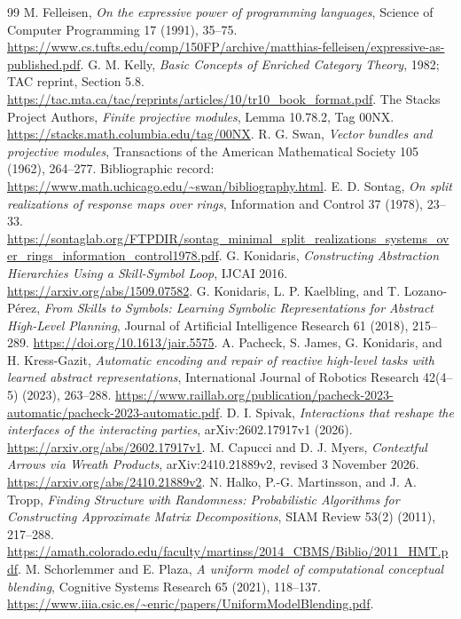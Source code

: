 \documentclass[11pt]{article}
\theoremstyle{definition}
\theoremstyle{remark}
\begin{document}
\begin{thebibliography}{99}
M. Felleisen, \emph{On the expressive power of programming languages}, Science of Computer Programming 17 (1991), 35--75.
\url{https://www.cs.tufts.edu/comp/150FP/archive/matthias-felleisen/expressive-as-published.pdf}.
G. M. Kelly, \emph{Basic Concepts of Enriched Category Theory}, 1982; TAC reprint, Section 5.8.
\url{https://tac.mta.ca/tac/reprints/articles/10/tr10_book_format.pdf}.
The Stacks Project Authors, \emph{Finite projective modules}, Lemma 10.78.2, Tag 00NX.
\url{https://stacks.math.columbia.edu/tag/00NX}.
R. G. Swan, \emph{Vector bundles and projective modules}, Transactions of the American Mathematical Society 105 (1962), 264--277.
Bibliographic record: \url{https://www.math.uchicago.edu/~swan/bibliography.html}.
E. D. Sontag, \emph{On split realizations of response maps over rings}, Information and Control 37 (1978), 23--33.
\url{https://sontaglab.org/FTPDIR/sontag_minimal_split_realizations_systems_over_rings_information_control1978.pdf}.
G. Konidaris, \emph{Constructing Abstraction Hierarchies Using a Skill-Symbol Loop}, IJCAI 2016.
\url{https://arxiv.org/abs/1509.07582}.
G. Konidaris, L. P. Kaelbling, and T. Lozano-P\'erez, \emph{From Skills to Symbols: Learning Symbolic Representations for Abstract High-Level Planning}, Journal of Artificial Intelligence Research 61 (2018), 215--289.
\url{https://doi.org/10.1613/jair.5575}.
A. Pacheck, S. James, G. Konidaris, and H. Kress-Gazit, \emph{Automatic encoding and repair of reactive high-level tasks with learned abstract representations}, International Journal of Robotics Research 42(4--5) (2023), 263--288.
\url{https://www.raillab.org/publication/pacheck-2023-automatic/pacheck-2023-automatic.pdf}.
D. I. Spivak, \emph{Interactions that reshape the interfaces of the interacting parties}, arXiv:2602.17917v1 (2026).
\url{https://arxiv.org/abs/2602.17917v1}.
M. Capucci and D. J. Myers, \emph{Contextful Arrows via Wreath Products}, arXiv:2410.21889v2, revised 3 November 2026.
\url{https://arxiv.org/abs/2410.21889v2}.
N. Halko, P.-G. Martinsson, and J. A. Tropp, \emph{Finding Structure with Randomness: Probabilistic Algorithms for Constructing Approximate Matrix Decompositions}, SIAM Review 53(2) (2011), 217--288.
\url{https://amath.colorado.edu/faculty/martinss/2014_CBMS/Biblio/2011_HMT.pdf}.
M. Schorlemmer and E. Plaza, \emph{A uniform model of computational conceptual blending}, Cognitive Systems Research 65 (2021), 118--137.
\url{https://www.iiia.csic.es/~enric/papers/UniformModelBlending.pdf}.
\end{thebibliography}
\end{document}
